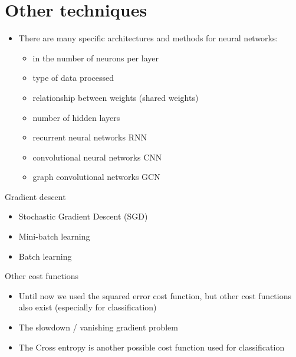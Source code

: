 \documentclass[usenames,dvipsnames]{beamer}
\begin{document}
\section{Other techniques}%
\label{sec:other_techniques}

\begin{frame}
    \begin{itemize}
        \item There are many specific architectures and methods for neural networks:
            \begin{itemize}
                \item in the number of neurons per layer
                \item type of data processed
                \item relationship between weights (shared weights)
                \item number of hidden layers
                \item recurrent neural networks RNN
                \item convolutional neural networks CNN
                \item graph convolutional networks GCN
            \end{itemize}
    \end{itemize}
\end{frame}

\begin{frame}{Gradient descent}
    \begin{itemize}
        \item Stochastic Gradient Descent (SGD)
        \item Mini-batch learning
        \item Batch learning
    \end{itemize}
\end{frame}


\begin{frame}{Other cost functions}
   \begin{itemize}
       \item Until now we used the squared error cost function, but other cost functions also exist (especially for classification)
       \item The slowdown / vanishing gradient problem
       \item The Cross entropy is another possible cost function used for classification
   \end{itemize} 
\end{frame}
\end{document}
